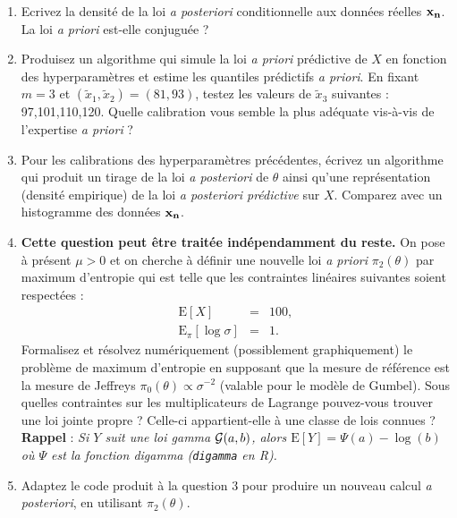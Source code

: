 \documentclass[10pt]{article}
\newcommand{\E}{\mbox{E}}
\newcommand{\1}{\mathbbm{1}}
\begin{document}
\begin{enumerate}
\item Ecrivez la densité de la loi {\it a posteriori} conditionnelle aux donn\'ees r\'eelles ${\bf x_n}$. La loi {\it a priori} est-elle conjuguée ? 
\item Produisez un algorithme qui simule la loi {\it a priori} prédictive de $X$ en fonction des hyperparamètres et estime les quantiles prédictifs {\it a priori}. En fixant $m=3$ et $(\tilde{x}_1,\tilde{x}_2)=(81,93)$, testez les valeurs de $\tilde{x}_3$ suivantes : 97,101,110,120. Quelle calibration vous semble la plus adéquate vis-à-vis de l'expertise {\it a priori} ? 
\item Pour les calibrations des hyperparamètres précédentes, écrivez un algorithme qui produit un tirage de la loi {\it a posteriori} de $\theta$ ainsi qu'une représentation (densité empirique) de la loi {\it a posteriori prédictive} sur $X$. Comparez avec un histogramme des données ${\bf x_n}$. 
\item {\bf Cette question peut être traitée indépendamment du reste.} On pose à présent $\mu>0$ et on cherche à définir une nouvelle loi {\it a priori} $\pi_2(\theta)$ par maximum d'entropie qui est telle que les contraintes linéaires suivantes soient respectées :
\begin{eqnarray*}
\E[X] & = & 100, \\
\E_{\pi}[\log \sigma] & = & 1.
\end{eqnarray*}
Formalisez et résolvez numériquement (possiblement graphiquement) le problème de maximum d'entropie en supposant que la mesure de référence est la mesure de Jeffreys $\pi_0(\theta) \propto \sigma^{-2}$ (valable pour le modèle de Gumbel). Sous quelles contraintes sur les multiplicateurs de Lagrange pouvez-vous trouver une loi jointe propre ? Celle-ci appartient-elle à une classe de lois connues ? \\

{\bf Rappel} : {\it Si $Y$ suit une loi gamma ${\cal{G}}(a,b)$, alors $\E[Y]=\Psi(a)-\log(b)$ où $\Psi$ est la fonction digamma (\texttt{digamma} en R). } \\

\item Adaptez le code produit à la question 3 pour produire un nouveau calcul {\it a posteriori}, en utilisant $\pi_2(\theta)$.
\end{enumerate}
\end{document}
